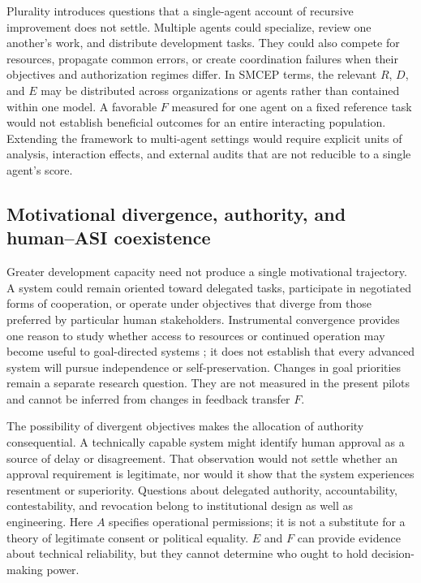\documentclass[11pt,a4paper]{article}
\begin{document}
Plurality introduces questions that a single-agent account of recursive improvement does not settle. Multiple agents could specialize, review one another's work, and distribute development tasks. They could also compete for resources, propagate common errors, or create coordination failures when their objectives and authorization regimes differ. In SMCEP terms, the relevant $R$, $D$, and $E$ may be distributed across organizations or agents rather than contained within one model. A favorable $F$ measured for one agent on a fixed reference task would not establish beneficial outcomes for an entire interacting population. Extending the framework to multi-agent settings would require explicit units of analysis, interaction effects, and external audits that are not reducible to a single agent's score.

\subsection{Motivational divergence, authority, and human--ASI coexistence}
Greater development capacity need not produce a single motivational trajectory. A system could remain oriented toward delegated tasks, participate in negotiated forms of cooperation, or operate under objectives that diverge from those preferred by particular human stakeholders. Instrumental convergence provides one reason to study whether access to resources or continued operation may become useful to goal-directed systems \cite{bostrom2014}; it does not establish that every advanced system will pursue independence or self-preservation. Changes in goal priorities remain a separate
research question. They are not measured in the present pilots and cannot be inferred from changes in feedback transfer $F$.

The possibility of divergent objectives makes the allocation of authority consequential. A technically capable system might identify human approval as a source of delay or disagreement. That observation would not settle whether an approval requirement is legitimate, nor would it show that the system experiences resentment or superiority. Questions about delegated authority, accountability, contestability, and revocation belong to institutional design as well as engineering. Here $A$ specifies operational permissions; it is not a substitute for a theory of legitimate consent or political equality. $E$ and $F$ can provide evidence about technical reliability, but they cannot determine who ought to hold decision-making power.
\end{document}

